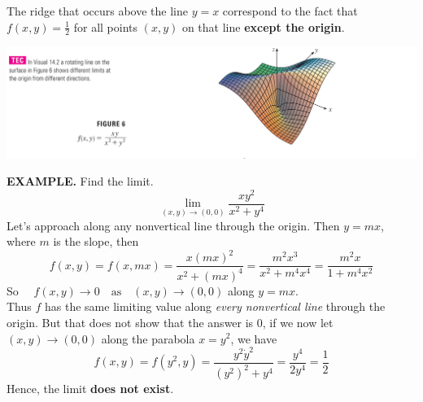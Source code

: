 \documentclass{article}
\begin{document}
The ridge that occurs above the line $y = x$ correspond to the fact that $f(x,y) = \frac{1 }{2 }$ for all points $(x,y)$ on that line \textbf{except the origin}.
\begin{center}
  \includegraphics[width = \linewidth]{./images/limeg2.png} 
\end{center}
{\selectfont \textbf{\textcolor{blue5}{EXAMPLE.}}} Find the limit.
\[\lim_{(x,y) \to (0,0)} \frac{x y^2 }{x^2 + y^4}\]
Let's approach along any nonvertical line through the origin. Then $y = mx$, where $m$ is the slope, then
\[f(x,y) = f(x, mx) = \frac{x(mx)^2}{x^2 + (mx)^4} = \frac{m^2 x^3}{x^2 + m^4 x^4} = \frac{m^2 x}{1 + m^4 x^2}\]
So $\quad f(x,y) \to 0 \quad \text{as} \quad (x,y) \to (0,0)$ along $y = mx$.\\
Thus $f$ has the same limiting value along \textit{every nonvertical line} through the origin. But that does not show that the answer is 0, if we now let $(x,y) \to (0,0)$ along the parabola $x = y^2$, we have 
\[f(x,y) = f(y^2, y) = \frac{y^2 \dot y^2 }{(y^2 )^2 + y^4} = \frac{y^4}{2y^4} = \frac{1 }{2 }\]
Hence, the limit \textbf{does not exist}.
\end{document}
